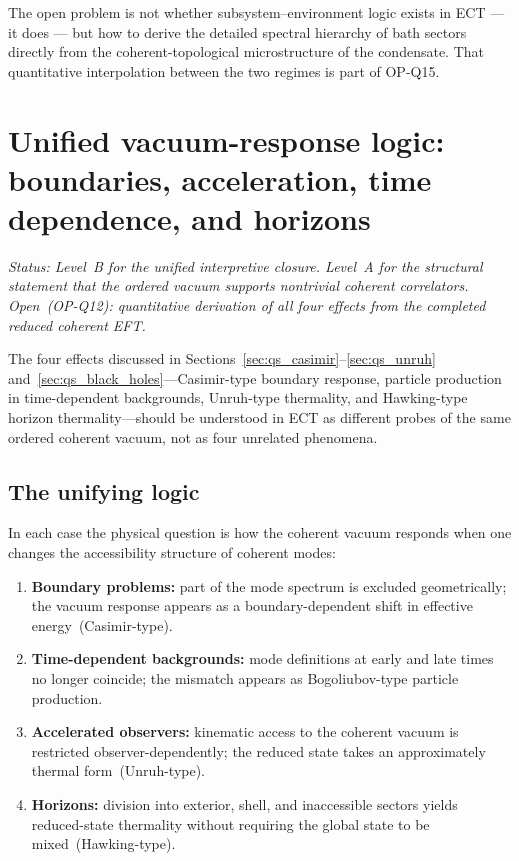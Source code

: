 \documentclass[11pt,a4paper]{article}
\numberwithin{equation}{section}
\begin{document}
The open problem is not whether subsystem--environment logic exists in
ECT --- it does --- but how to derive the detailed spectral hierarchy of
bath sectors directly from the coherent-topological microstructure of the
condensate.
That quantitative interpolation between the two regimes is part of
OP-Q15.

\section{Unified vacuum-response logic: boundaries, acceleration,
time dependence, and horizons}
\label{app:qs_vacuum_response}

\textit{Status: Level~B for the unified interpretive closure.
Level~A for the structural statement that the ordered vacuum supports
nontrivial coherent correlators.
Open~(OP-Q12): quantitative derivation of all four effects from the
completed reduced coherent EFT.}

\medskip
The four effects discussed in
Sections~\ref{sec:qs_casimir}--\ref{sec:qs_unruh}
and~\ref{sec:qs_black_holes}---Casimir-type boundary response, particle
production in time-dependent backgrounds, Unruh-type thermality, and
Hawking-type horizon thermality---should be understood in ECT as
different probes of the same ordered coherent vacuum, not as four
unrelated phenomena.

\subsection*{The unifying logic}

In each case the physical question is how the coherent vacuum responds
when one changes the accessibility structure of coherent modes:
\begin{enumerate}[label=(\roman*)]
  \item \textbf{Boundary problems:} part of the mode spectrum is
    excluded geometrically; the vacuum response appears as a
    boundary-dependent shift in effective energy~(Casimir-type).
  \item \textbf{Time-dependent backgrounds:} mode definitions at early
    and late times no longer coincide; the mismatch appears as
    Bogoliubov-type particle production.
  \item \textbf{Accelerated observers:} kinematic access to the coherent
    vacuum is restricted observer-dependently; the reduced state takes
    an approximately thermal form~(Unruh-type).
  \item \textbf{Horizons:} division into exterior, shell, and inaccessible
    sectors yields reduced-state thermality without requiring the global
    state to be mixed~(Hawking-type).
\end{enumerate}
\end{document}
